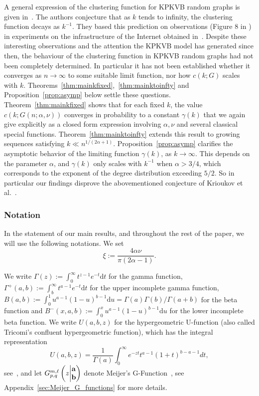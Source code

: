 A general expression of the clustering function for KPKVB random graphs is given in~\cite[Equation (59)]{krioukov2010hyperbolic}. The authors conjecture that as $k$ tends to infinity, the clustering function decays as $k^{-1}$. They based this prediction on observations (Figure 8 in \cite{krioukov2010hyperbolic}) in experiments on the infrastructure of the Internet obtained in~\cite{claffy2009internet}. Despite these interesting observations and the attention the KPKVB model has generated since then, the behaviour of the clustering function in KPKVB random graphs had not been completely determined. In particular it has not been established whether it converges as $n\to\infty$ to some suitable limit function, nor how $c(k;G)$ scales with $k$. Theorems~\ref{thm:mainkfixed},~\ref{thm:mainktoinfty} and Proposition~\ref{prop:asymp} below settle these questions. Theorem~\ref{thm:mainkfixed} shows that for each fixed $k$, the value $c(k;G(n;\alpha,\nu))$ converges in probability to a constant $\gamma(k)$ that we again give explicitly as a closed form expression involving $\alpha,\nu$ and several classical special functions. Theorem~\ref{thm:mainktoinfty} extends this result to growing sequences satisfying $k \ll n^{1/(2\alpha+1)}$. Proposition~\ref{prop:asymp} clarifies the asymptotic behavior of the limiting function $\gamma(k)$, as $k\to\infty$. This depends on the parameter $\alpha$, and $\gamma(k)$ only scales with $k^{-1}$ when $\alpha > 3/4$, which corresponds to the exponent of the degree distribution exceeding $5/2$. 
So in particular our findings disprove the abovementioned conjecture of Krioukov et al.~\cite{krioukov2010hyperbolic}.


\subsubsection*{Notation}

In the statement of our main results, and throughout the rest of the paper, we will use the following notations. 
We set 
$$\xi := \frac{4\alpha\nu}{\pi(2\alpha-1)}. $$

We write $\Gamma(z) := \int_0^\infty t^{z-1} e^{-t}\text{d}t$ for the gamma function, 
$\Gamma^+(a,b) := \int_b^\infty t^{a-1} e^{-t}\text{d}t$ for the upper incomplete gamma function, 
 $B(a,b) := \int_0^1 u^{a-1}(1-u)^{b-1}\text{d}u = \Gamma(a)\Gamma(b) / \Gamma(a+b)$ for the beta function and 
 $B^-(x,a,b) := \int_0^x u^{a-1}(1-u)^{b-1}\text{d}u$ for the lower incomplete beta function. 
We write $U(a,b,z)$ for the hypergeometric U-function (also called Tricomi's confluent hypergeometric function), which 
has the integral representation 
\[
	U(a,b,z) = \frac{1}{\Gamma(a)} \int_0^\infty e^{-zt} t^{a-1} (1+t)^{b-a-1} dt,
\] 
see~\cite[p.255 Equation (2)]{erdelyi1953higher}, and let $\MeijerGnew{m}{\ell}{p}{q}{{\bf a}}{{\bf b}}{z}$ denote 
Meijer's G-Function~\cite{meijer1946gfunction}, see Appendix~\ref{sec:Meijer_G_functions} for more details.

